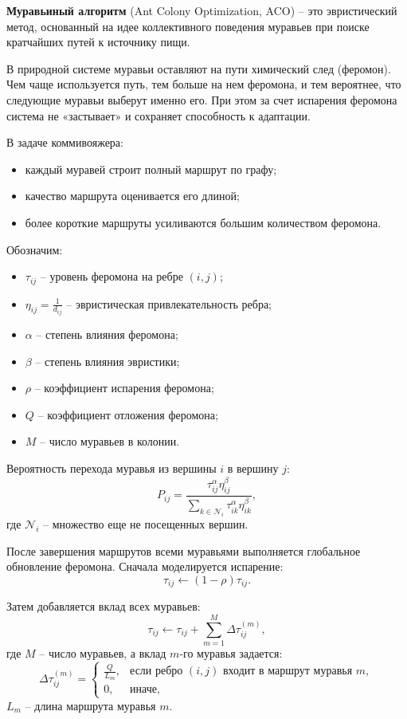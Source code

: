 \documentclass[12pt,a4paper]{article}
\begin{document}
\textbf{Муравьиный алгоритм} (Ant Colony Optimization, ACO) -- это эвристический
метод, основанный на идее коллективного поведения муравьев при поиске кратчайших
путей к источнику пищи.

В природной системе муравьи оставляют на пути химический след (феромон). Чем чаще
используется путь, тем больше на нем феромона, и тем вероятнее, что следующие муравьи
выберут именно его. При этом за счет испарения феромона система не «застывает» и
сохраняет способность к адаптации.

В задаче коммивояжера:
\begin{itemize}
    \item каждый муравей строит полный маршрут по графу;
    \item качество маршрута оценивается его длиной;
    \item более короткие маршруты усиливаются большим количеством феромона.
\end{itemize}

Обозначим:
\begin{itemize}
    \item $\tau_{ij}$ -- уровень феромона на ребре $(i,j)$;
    \item $\eta_{ij}=\frac{1}{d_{ij}}$ -- эвристическая привлекательность ребра;
    \item $\alpha$ -- степень влияния феромона;
    \item $\beta$ -- степень влияния эвристики;
    \item $\rho$ -- коэффициент испарения феромона;
    \item $Q$ -- коэффициент отложения феромона;
    \item $M$ -- число муравьев в колонии.
\end{itemize}

Вероятность перехода муравья из вершины $i$ в вершину $j$:
\begin{equation}
P_{ij}=
\frac{\tau_{ij}^{\alpha}\eta_{ij}^{\beta}}
{\sum\limits_{k \in \mathcal{N}_i} \tau_{ik}^{\alpha}\eta_{ik}^{\beta}},
\end{equation}
где $\mathcal{N}_i$ -- множество еще не посещенных вершин.

После завершения маршрутов всеми муравьями выполняется глобальное обновление феромона.
Сначала моделируется испарение:
\begin{equation}
\tau_{ij} \leftarrow (1-\rho)\tau_{ij}.
\end{equation}

Затем добавляется вклад всех муравьев:
\begin{equation}
\tau_{ij} \leftarrow \tau_{ij} + \sum_{m=1}^{M}\Delta\tau_{ij}^{(m)},
\end{equation}
где $M$ -- число муравьев, а вклад $m$-го муравья задается:
\begin{equation}
\Delta\tau_{ij}^{(m)}=
\begin{cases}
\frac{Q}{L_m}, & \text{если ребро }(i,j)\text{ входит в маршрут муравья }m,\\
0, & \text{иначе},
\end{cases}
\end{equation}
$L_m$ -- длина маршрута муравья $m$.
\end{document}
